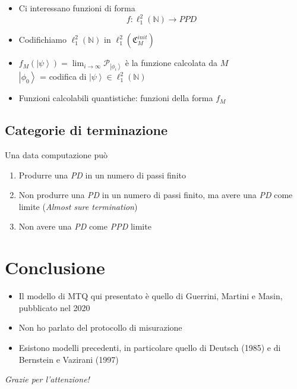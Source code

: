 \documentclass{beamer}
\newcommand{\ket}[1]{\left | #1 \right \rangle}
\newcommand{\conf}{\mathfrak{C}_{M}}
\newcommand{\hil}{\ell^{2}}
\newcommand{\hiluninorm}{\hil_{1}}
\begin{document}
\begin{frame}{\secname}{}
	\begin{itemize}
		\item<+-> Ci interessano funzioni di forma \[ f : \hiluninorm \left ( \mathbb{N} \right ) \rightarrow PPD \]
		\item<+-> Codifichiamo \( \hiluninorm \left ( \mathbb{N} \right ) \) in \( \hiluninorm \left ( \conf^{init} \right ) \)
		\item<+-> \( f_M(\ket{\psi}) = \lim_{i \to \infty} \mathcal{P}_{\ket{\phi_{i}}} \) è la \alert{funzione calcolata} da \(M\) \\
		\(\ket{\phi_0}\) = codifica di \(\ket{\psi} \in \hiluninorm \left ( \mathbb{N} \right )\)
		\item<+-> \alert{Funzioni calcolabili quantistiche}: funzioni della forma \(f_M\)
	\end{itemize}
\end{frame}

\subsection{Categorie di terminazione}

\begin{frame}{\subsecname}{}
	Una data computazione può
	\begin{enumerate}
		\item<+-> Produrre una \textit{PD} in un numero di passi finito
		\item<+-> Non produrre una \textit{PD} in un numero di passi finito, ma avere una \textit{PD} come limite (\foreignlanguage{english}{\textit{Almost sure termination}})
		\item<+-> Non avere una \textit{PD} come \textit{PPD} limite
	\end{enumerate}
\end{frame}

\section{Conclusione}

\begin{frame}{\secname}{}
	\begin{itemize}
		\item<+-> Il modello di MTQ qui presentato è quello di Guerrini, Martini e Masin, pubblicato nel 2020
		\item<+-> Non ho parlato del protocollo di misurazione
		\item<+-> Esistono modelli precedenti, in particolare quello di Deutsch (1985) e di Bernstein e Vazirani (1997)
	\end{itemize}
\end{frame}

\begin{frame}{}
	\centering \huge
	\emph{Grazie per l'attenzione!}
\end{frame}
\end{document}
